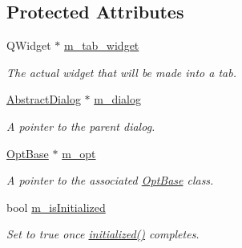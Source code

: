 \subsection*{Protected Attributes}
\begin{DoxyCompactItemize}
\item 
\hypertarget{classGlobalSearch_1_1AbstractTab_a7c461733097abaefd6709de1516b2b6b}{}Q\+Widget $\ast$ \hyperlink{classGlobalSearch_1_1AbstractTab_a7c461733097abaefd6709de1516b2b6b}{m\+\_\+tab\+\_\+widget}\label{classGlobalSearch_1_1AbstractTab_a7c461733097abaefd6709de1516b2b6b}

\begin{DoxyCompactList}\small\item\em The actual widget that will be made into a tab. \end{DoxyCompactList}\item 
\hypertarget{classGlobalSearch_1_1AbstractTab_a1bbcd914bf7dfc64f0c7212719ce8001}{}\hyperlink{classGlobalSearch_1_1AbstractDialog}{Abstract\+Dialog} $\ast$ \hyperlink{classGlobalSearch_1_1AbstractTab_a1bbcd914bf7dfc64f0c7212719ce8001}{m\+\_\+dialog}\label{classGlobalSearch_1_1AbstractTab_a1bbcd914bf7dfc64f0c7212719ce8001}

\begin{DoxyCompactList}\small\item\em A pointer to the parent dialog. \end{DoxyCompactList}\item 
\hypertarget{classGlobalSearch_1_1AbstractTab_a1bf5c32868bc8e6024358078838fb87a}{}\hyperlink{classGlobalSearch_1_1OptBase}{Opt\+Base} $\ast$ \hyperlink{classGlobalSearch_1_1AbstractTab_a1bf5c32868bc8e6024358078838fb87a}{m\+\_\+opt}\label{classGlobalSearch_1_1AbstractTab_a1bf5c32868bc8e6024358078838fb87a}

\begin{DoxyCompactList}\small\item\em A pointer to the associated \hyperlink{classGlobalSearch_1_1OptBase}{Opt\+Base} class. \end{DoxyCompactList}\item 
\hypertarget{classGlobalSearch_1_1AbstractTab_a98d4e176a6385cc5ef29c1436cac1e46}{}bool \hyperlink{classGlobalSearch_1_1AbstractTab_a98d4e176a6385cc5ef29c1436cac1e46}{m\+\_\+is\+Initialized}\label{classGlobalSearch_1_1AbstractTab_a98d4e176a6385cc5ef29c1436cac1e46}

\begin{DoxyCompactList}\small\item\em Set to true once \hyperlink{classGlobalSearch_1_1AbstractTab_aed63eed75abeb8c0e1e87344225f95cd}{initialized()} completes. \end{DoxyCompactList}\end{DoxyCompactItemize}


